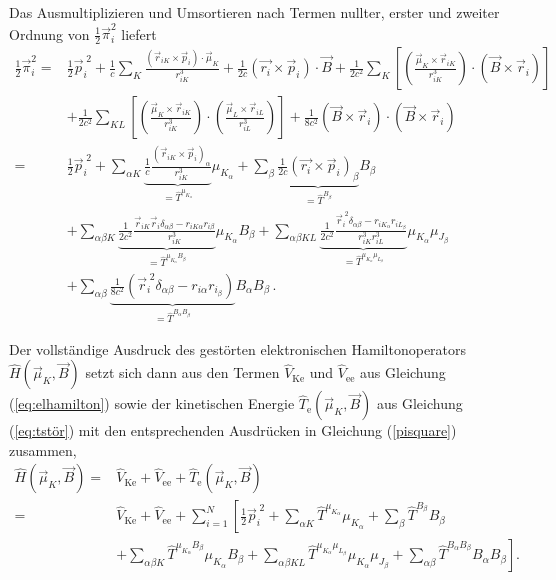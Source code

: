 	Das Ausmultiplizieren und Umsortieren nach Termen nullter, erster und zweiter Ordnung von $\frac{1}{2}\vec{\pi}_i^2$ liefert
\begingroup
\small	
	\begin{equation}\label{pisquare}
	\begin{aligned}
	\frac{1}{2}\vec{\pi}_i^2=&\frac{1}{2}\vec{p}_i^{\;2}+\frac{1}{c}\sum_K\frac{(\vec{r}_{iK}\times\vec{p}_{i})\cdot\vec{\mu}_K}{r_{iK}^3}+\frac{1}{2c}(\vec{r_i}\times \vec{p}_i)\cdot \vec{B}+ \frac{1}{2c^2}\sum_K\left[\left(\frac{\vec{\mu}_K\times\vec{r}_{iK}}{r_{iK}^3}\right)\cdot\left(\vec{B}\times\vec{r}_i\right)\right]\\
	&+\frac{1}{2c^2}\sum_{KL}\left[\left(\frac{\vec{\mu}_K\times\vec{r}_{iK}}{r_{iK}^3}\right)\cdot\left(\frac{\vec{\mu}_L\times\vec{r}_{iL}}{r_{iL}^3}\right)\right]+\frac{1}{8c^2}(\vec{B}\times\vec{r}_i)\cdot(\vec{B}\times\vec{r}_i) \\
	=&\frac{1}{2}\vec{p}_i^{\;2}
	+\sum_{\alpha K}\underbrace{\frac{1}{c}\frac{(\vec{r}_{iK}\times\vec{p}_{i})_\alpha}{r_{iK}^3}}_{=\hat{T}^{\mu_{K_\alpha}}}\mu_{K_\alpha}
	+\sum_\beta\underbrace{\frac{1}{2c}(\vec{r_i}\times \vec{p}_i)_\beta}_{=\hat{T}^{B_\beta}} B_\beta\\
	&+\sum_{\alpha\beta K} \underbrace{\frac{1}{2c^2}\frac{\vec{r}_{iK}\vec{r}_{i}\delta_{\alpha\beta}-r_{iK\alpha}r_{i\beta}}{r_{iK}^3}}_{=\hat{T}^{\mu_{K_\alpha}B_\beta}}\mu_{K_\alpha}B_\beta
	+\sum_{\alpha\beta KL}\underbrace{\frac{1}{2c^2}\frac{\vec{r}_i^{\; 2}\delta_{\alpha\beta}-r_{iK_\alpha}r_{iL_\beta}}{r_{iK}^3r_{iL}^3}}_{=\hat{T}^{\mu_{K_\alpha}\mu_{L_\beta}}}\mu_{K_\alpha}\mu_{J_\beta}\\
	&+\sum_{\alpha\beta}\underbrace{\frac{1}{8c^2}\left(\vec{r}_i^{\; 2}\delta_{\alpha\beta}-r_{i\alpha}r_{i_\beta}\right)}_{=\hat{T}^{B_\alpha B_\beta}}B_\alpha B_\beta\, .
	\end{aligned}
	\end{equation}
\endgroup

	Der vollständige Ausdruck des gestörten elektronischen Hamiltonoperators $\hat{H}(\vec{\mu}_K,\vec{B})$ setzt sich dann aus den Termen $\hat{V}_{\textrm{Ke}}$ und $\hat{V}_{\textrm{ee}}$ aus Gleichung (\ref{eq:elhamilton}) sowie der kinetischen Energie $\hat{T}_\textrm{e}(\vec{\mu}_K,\vec{B})$ aus Gleichung (\ref{eq:tstör}) mit den entsprechenden Ausdrücken in Gleichung (\ref{pisquare}) zusammen, 
	\begin{equation}\label{eq:hvonbmu}
	\begin{aligned}
	\hat{H}(\vec{\mu}_K,\vec{B})=&\hat{V}_{\textrm{Ke}}+\hat{V}_{\textrm{ee}}+\hat{T}_\textrm{e}(\vec{\mu}_K,\vec{B})\\
	=&\hat{V}_{\textrm{Ke}}+\hat{V}_{\textrm{ee}}+\sum_{i=1}^N\left[\frac{1}{2}\vec{p}_i^{\; 2}+\sum_{\alpha K}\hat{T}^{\mu_{K_\alpha}}\mu_{K_\alpha}+\sum_\beta\hat{T}^{B_\beta}B_\beta\right. \\
	&+\left.\sum_{\alpha\beta K}\hat{T}^{\mu_{K_\alpha}B_\beta}\mu_{K_\alpha}B_\beta+\sum_{\alpha\beta KL}\hat{T}^{\mu_{K_\alpha}\mu_{L_\beta}}\mu_{K_\alpha}\mu_{J_\beta}+\sum_{\alpha\beta}\hat{T}^{B_\alpha B_\beta}B_\alpha B_\beta\right].
	\end{aligned}
	\end{equation}
	
